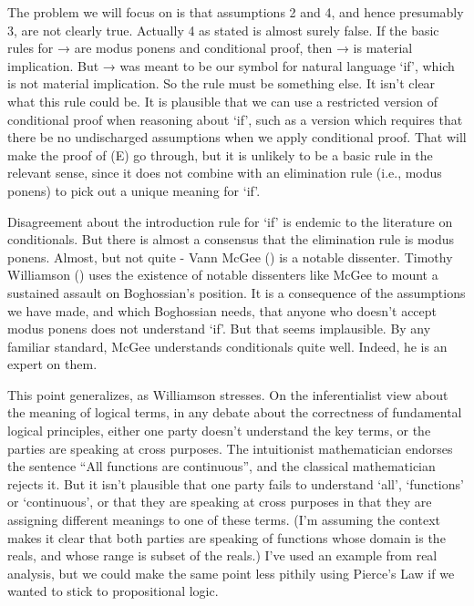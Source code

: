 \documentclass[
  10pt,
  letterpaper,
  DIV=11,
  numbers=noendperiod,
  twoside]{scrartcl}
\begin{document}
The problem we will focus on is that assumptions 2 and 4, and hence
presumably 3, are not clearly true. Actually 4 as stated is almost
surely false. If the basic rules for → are modus ponens and conditional
proof, then → is material implication. But → was meant to be our symbol
for natural language `if', which is not material implication. So the
rule must be something else. It isn't clear what this rule could be. It
is plausible that we can use a restricted version of conditional proof
when reasoning about `if', such as a version which requires that there
be no undischarged assumptions when we apply conditional proof. That
will make the proof of (E) go through, but it is unlikely to be a basic
rule in the relevant sense, since it does not combine with an
elimination rule (i.e., modus ponens) to pick out a unique meaning for
`if'.

Disagreement about the introduction rule for `if' is endemic to the
literature on conditionals. But there is almost a consensus that the
elimination rule is modus ponens. Almost, but not quite - Vann McGee
() is a notable dissenter. Timothy
Williamson () uses the
existence of notable dissenters like McGee to mount a sustained assault
on Boghossian's position. It is a consequence of the assumptions we have
made, and which Boghossian needs, that anyone who doesn't accept modus
ponens does not understand `if'. But that seems implausible. By any
familiar standard, McGee understands conditionals quite well. Indeed, he
is an expert on them.

This point generalizes, as Williamson stresses. On the inferentialist
view about the meaning of logical terms, in any debate about the
correctness of fundamental logical principles, either one party doesn't
understand the key terms, or the parties are speaking at cross purposes.
The intuitionist mathematician endorses the sentence ``All functions are
continuous'', and the classical mathematician rejects it. But it isn't
plausible that one party fails to understand `all', `functions' or
`continuous', or that they are speaking at cross purposes in that they
are assigning different meanings to one of these terms. (I'm assuming
the context makes it clear that both parties are speaking of functions
whose domain is the reals, and whose range is subset of the reals.) I've
used an example from real analysis, but we could make the same point
less pithily using Pierce's Law if we wanted to stick to propositional
logic.
\end{document}
